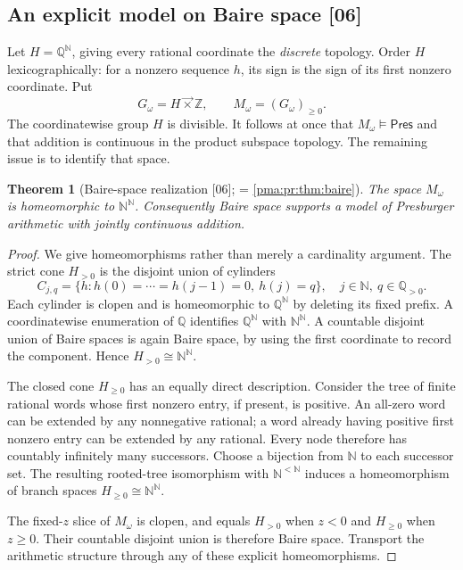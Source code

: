 \documentclass[11pt]{article}
\numberwithin{equation}{section}
\newtheorem{theorem}{Theorem}[section]
\theoremstyle{definition}
\theoremstyle{remark}
\newcommand{\N}{\mathbb N}
\newcommand{\Z}{\mathbb Z}
\newcommand{\Q}{\mathbb Q}
\newcommand{\Baire}{\N^{\N}}
\newcommand{\lex}{\mathbin{\overrightarrow\times}}
\newcommand{\src}[1]{\textup{\textsf{\small[#1]}}}
\newcommand{\Pres}{\mathsf{Pres}}
\begin{document}
\subsection{An explicit model on Baire space \src{06}}
\label{pma:cp:s06:sec:baire}

Let $H=\Q^{\N}$, giving every rational coordinate the \emph{discrete}
topology. Order $H$ lexicographically: for a nonzero sequence $h$, its
sign is the sign of its first nonzero coordinate. Put
\[
 G_\omega=H\lex\Z,\qquad M_\omega=(G_\omega)_{\geq0}.
\]
The coordinatewise group $H$ is divisible. It follows at once that
$M_\omega\models\Pres$ and that addition is continuous in the product
subspace topology. The remaining issue is to identify that space.

\begin{theorem}[Baire-space realization \src{06}; = \cref{pma:pr:thm:baire}]
\label{pma:cp:s06:thm:baire}
The space $M_\omega$ is homeomorphic to $\Baire$. Consequently Baire space
supports a model of Presburger arithmetic with jointly continuous
addition.
\end{theorem}

\begin{proof}
We give homeomorphisms rather than merely a cardinality argument.
The strict cone $H_{>0}$ is the disjoint union of cylinders
\[
 C_{j,q}=\{h:h(0)=\cdots=h(j-1)=0,\ h(j)=q\},
 \quad j\in\N,\ q\in\Q_{>0}.
\]
Each cylinder is clopen and is homeomorphic to $\Q^{\N}$ by deleting
its fixed prefix. A coordinatewise enumeration of $\Q$ identifies
$\Q^{\N}$ with $\Baire$. A countable disjoint union of Baire spaces
is again Baire space, by using the first coordinate to record the
component. Hence $H_{>0}\cong\Baire$.

The closed cone $H_{\geq0}$ has an equally direct description. Consider
the tree of finite rational words whose first nonzero entry, if present,
is positive. An all-zero word can be extended by any nonnegative
rational; a word already having positive first nonzero entry can be
extended by any rational. Every node therefore has countably infinitely
many successors. Choose a bijection from $\N$ to each successor set.
The resulting rooted-tree isomorphism with $\N^{<\N}$ induces a
homeomorphism of branch spaces $H_{\geq0}\cong\Baire$.

The fixed-$z$ slice of $M_\omega$ is clopen, and equals $H_{>0}$ when
$z<0$ and $H_{\geq0}$ when $z\geq0$. Their countable disjoint union is
therefore Baire space. Transport the arithmetic structure through any
of these explicit homeomorphisms.
\end{proof}
\end{document}
